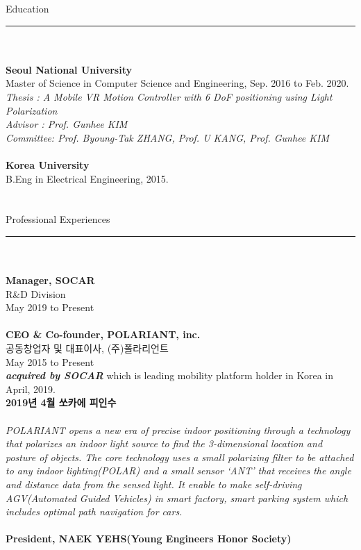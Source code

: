 \documentclass[letterpaper,11pt,oneside]{article}
\begin{document}
\noindent 
 \Large{Education}   \\ 
\noindent\rule{8cm}{0.4pt}\\
 \\
\normalsize\textbf{Seoul National University} \\
Master of Science in Computer Science and Engineering, Sep. 2016 to Feb. 2020. \\
\emph{Thesis : A Mobile VR Motion Controller with 6 DoF positioning using Light Polarization} \\
\emph{Advisor : Prof. Gunhee KIM} \\
\emph{Committee: Prof. Byoung-Tak ZHANG, Prof. U KANG, Prof. Gunhee KIM}
\\
\\
\textbf{Korea University} \\
B.Eng in Electrical Engineering, 2015. \\
\\
\\
 \Large{Professional Experiences}   \\
 \noindent\rule{8cm}{0.4pt}\\
 \\
 \normalsize\textbf{{Manager}, SOCAR} \\
R\&D Division \\
May 2019 to Present \\
\\
\textbf{{CEO \& Co-founder}, POLARIANT, inc.} \\
공동창업자 및 대표이사, (주)폴라리언트 \\
May 2015 to Present \\
\textbf{\emph{acquired by SOCAR}} which is leading mobility platform holder in Korea in April, 2019. \\
\textbf{2019년 4월 쏘카에 피인수}\\
\\
\emph{POLARIANT opens a new era of precise indoor positioning through a technology that polarizes an indoor light source to find the 3-dimensional location and posture of objects. The core technology uses a small polarizing filter to be attached to any indoor lighting(POLAR) and a small sensor ‘ANT’ that receives the angle and distance data from the sensed light. It enable to make self-driving AGV(Automated Guided Vehicles) in smart factory, smart parking system which includes optimal path navigation for cars.}\\
\\
\textbf{President, NAEK YEHS(Young Engineers Honor Society)}\\
\end{document}
